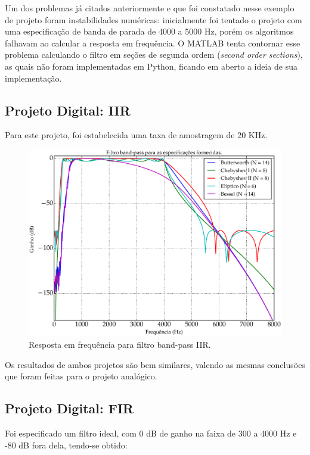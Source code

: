 Um dos problemas já citados anteriormente e que foi constatado nesse exemplo de projeto foram instabilidades numéricas: inicialmente foi tentado o projeto com uma especificação de banda de parada de 4000 a 5000 Hz, porém os algoritmos falhavam ao calcular a resposta em frequência. O MATLAB tenta contornar esse problema calculando o filtro em seções de segunda ordem (\textit{second order sections}), as quais não foram implementadas em Python, ficando em aberto a ideia de sua implementação.

\subsection{Projeto Digital: IIR}
Para este projeto, foi estabelecida uma taxa de amostragem de 20 KHz.

\begin{figure}[H]
  \centering
  \includegraphics[scale=0.5]{images/plots/bandpass_IIR}
  \caption{Resposta em frequência para filtro band-pass IIR.}
  \label{fig:bandpass_IIR}
\end{figure}

Os resultados de ambos projetos são bem similares, valendo as mesmas conclusões que foram feitas para o projeto analógico.

\subsection{Projeto Digital: FIR}

Foi especificado um filtro ideal, com 0 dB de ganho na faixa de 300 a 4000 Hz e -80 dB fora dela, tendo-se obtido: 

